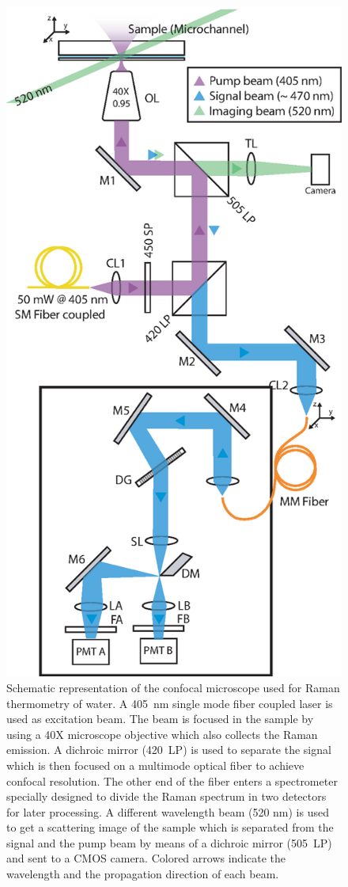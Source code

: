 \documentclass[9pt,twocolumn,twoside]{osajnl}
\begin{document}
\begin{figure}[htbp]
\centering
\includegraphics[width=\columnwidth]{figs/fig1.eps}
\caption{Schematic representation of the confocal microscope used for Raman thermometry of water. A 405~nm single mode fiber coupled laser is used as excitation beam. The beam is focused in the sample by using a 40X microscope objective which also collects the Raman emission. A dichroic mirror (420~LP) is used to separate the signal which is then focused on a multimode optical fiber to achieve confocal resolution. The other end of the fiber enters a spectrometer specially designed to divide the Raman spectrum in two detectors for later processing. A different wavelength beam (520 nm) is used to get a scattering image of the sample which is separated from the signal and the pump beam by means of a dichroic mirror (505~LP) and sent to a CMOS camera. Colored arrows indicate the wavelength and the propagation direction of each beam.\label{fig:setup}}

\end{figure}
\end{document}
